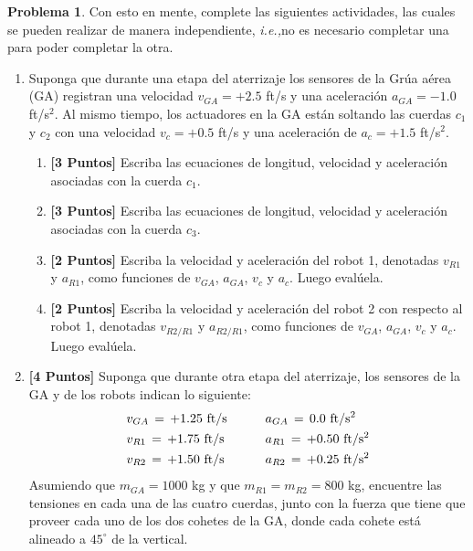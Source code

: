 \documentclass[ a4paper, twoside, 11pt]{article}
\newcommand{\ie}{\textit{i.e.,\;}}
\newcommand{\tsup}[1]{\ensuremath{^{\text{#1}}}}
\theoremstyle{definition}
\newtheorem{problem}[definition]{Problema}
\begin{document}
\begin{problem}
Con esto en mente, complete las siguientes actividades, las cuales se pueden realizar de manera independiente, \ie no es necesario completar una para poder completar la otra. 
\begin{enumerate}
\item Suponga que durante una etapa del aterrizaje los sensores de la Gr\'ua a\'erea (GA) registran una velocidad $v_{GA} = +2.5$ ft/s y una aceleraci\'on $a_{GA} = -1.0$ ft/s\tsup{2}. Al mismo tiempo, los actuadores en la GA est\'an soltando las cuerdas $c_1$ y $c_2$ con una velocidad $v_c = +0.5$ ft/s y una aceleraci\'on de $a_c = +1.5$ ft/s\tsup{2}. 
\begin{enumerate}[label=\alph*.]
\item \textbf{[3 Puntos]} Escriba las ecuaciones de longitud, velocidad y aceleraci\'on asociadas con la cuerda $c_1$. 
\item \textbf{[3 Puntos]} Escriba las ecuaciones de longitud, velocidad y aceleraci\'on asociadas con la cuerda $c_3$. 
\item \textbf{[2 Puntos]} Escriba la velocidad y aceleraci\'on del robot 1, denotadas $v_{R1}$ y $a_{R1}$, como funciones de $v_{GA}$, $a_{GA}$, $v_c$ y $a_c$. Luego eval\'uela. 
\item \textbf{[2 Puntos]} Escriba la velocidad y aceleraci\'on del robot 2 con respecto al robot 1, denotadas $v_{R2/R1}$ y $a_{R2/R1}$, como funciones de $v_{GA}$, $a_{GA}$, $v_c$ y $a_c$. Luego eval\'uela. 
\end{enumerate}
\item \textbf{[4 Puntos]} Suponga que durante otra etapa del aterrizaje, los sensores de la GA y de los robots indican lo siguiente: 
\begin{align*}
& v_{GA} \, = \, +1.25 \text{ ft/s} & \qquad 
& a_{GA} \, = \, 0.0 \text{ ft/s\tsup{2}} \\
& v_{R1} \, = \, +1.75 \text{ ft/s} & \qquad 
& a_{R1} \, = \, +0.50 \text{ ft/s\tsup{2}} \\
& v_{R2} \, = \, +1.50 \text{ ft/s} & \qquad 
& a_{R2} \, = \, +0.25 \text{ ft/s\tsup{2}}
\end{align*}
Asumiendo que $m_{GA} = 1000$ kg y que $m_{R1} = m_{R2} = 800$ kg, encuentre las tensiones en cada una de las cuatro cuerdas, junto con la fuerza que tiene que proveer cada uno de los dos cohetes de la GA, donde cada cohete est\'a alineado a $45^{\circ}$ de la vertical. 
\end{enumerate}

\end{problem}
\vspace{\baselineskip}
\end{document}
